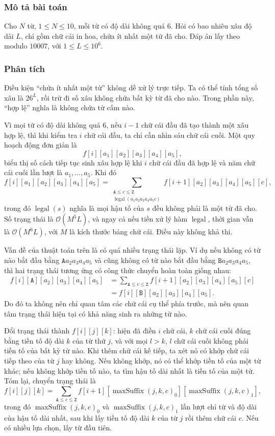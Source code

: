\documentclass[11pt]{article}
\newcommand{\Oh}{\mathcal{O}}
\newcommand{\legal}{\operatorname{legal}}
\newcommand{\maxSuffix}{\operatorname{maxSuffix}}
\begin{document}
\subsubsection{Mô tả bài toán}

Cho \(N\) từ, \(1\le N\le 10\), mỗi từ có độ dài không quá \(6\). Hỏi có bao
nhiêu xâu độ dài \(L\), chỉ gồm chữ cái in hoa, chứa ít nhất một từ đã cho.
Đáp án lấy theo modulo \(10007\), với \(1\le L\le 10^6\).

\subsubsection{Phân tích}

Điều kiện ``chứa ít nhất một từ'' không dễ xử lý trực tiếp. Ta có thể tính
tổng số xâu là \(26^L\), rồi trừ đi số xâu không chứa bất kỳ từ đã cho nào.
Trong phần này, ``hợp lệ'' nghĩa là không chứa từ cấm nào.

Vì mọi từ có độ dài không quá \(6\), nếu \(i-1\) chữ cái đầu đã tạo thành một
xâu hợp lệ, thì khi kiểm tra \(i\) chữ cái đầu, ta chỉ cần nhìn sáu chữ cái
cuối. Một quy hoạch động đơn giản là
\[
  f[i][a_1][a_2][a_3][a_4][a_5],
\]
biểu thị số cách tiếp tục sinh xâu hợp lệ khi \(i\) chữ cái đầu đã hợp lệ và
năm chữ cái cuối lần lượt là \(a_1,\ldots,a_5\). Khi đó
\[
  f[i][a_1][a_2][a_3][a_4][a_5]
  =
  \sum_{\substack{\texttt{A}\le c\le \texttt{Z}\\
      \legal(a_1a_2a_3a_4a_5c)}}
  f[i+1][a_2][a_3][a_4][a_5][c],
\]
trong đó \(\legal(s)\) nghĩa là mọi hậu tố của \(s\) đều không phải là một từ
đã cho. Số trạng thái là \(\Oh(M^5L)\), và ngay cả nếu tiền xử lý hàm
\(\legal\), thời gian vẫn là \(\Oh(M^6L)\), với \(M\) là kích thước bảng chữ
cái. Điều này không khả thi.

Vấn đề của thuật toán trên là có quá nhiều trạng thái lặp. Ví dụ nếu không có
từ nào bắt đầu bằng \(\texttt{A}a_2a_3a_4a_5\) và cũng không có từ nào bắt đầu
bằng \(\texttt{B}a_2a_3a_4a_5\), thì hai trạng thái tương ứng có công thức
chuyển hoàn toàn giống nhau:
\[
\begin{aligned}
  f[i][\texttt{A}][a_2][a_3][a_4][a_5]
  &=
  \sum_{\texttt{A}\le c\le\texttt{Z}}
  f[i+1][a_2][a_3][a_4][a_5][c]\\
  &=f[i][\texttt{B}][a_2][a_3][a_4][a_5].
\end{aligned}
\]
Do đó ta không nên chỉ quan tâm các chữ cái cụ thể phía trước, mà nên quan tâm
trạng thái hiện tại có khả năng sinh ra những từ nào.

Đổi trạng thái thành \(f[i][j][k]\): hiện đã điền \(i\) chữ cái, \(k\) chữ cái
cuối đúng bằng tiền tố độ dài \(k\) của từ thứ \(j\), và với mọi \(l>k\), \(l\)
chữ cái cuối không phải tiền tố của bất kỳ từ nào. Khi thêm chữ cái kế tiếp,
ta xét nó có khớp chữ cái tiếp theo của từ \(j\) hay không. Nếu không khớp, nó
có thể khớp tiền tố của một từ khác; nếu không khớp tiền tố nào, ta tìm hậu tố
dài nhất là tiền tố của một từ. Tóm lại, chuyển trạng thái là
\[
  f[i][j][k]
  =
  \sum_{\texttt{A}\le c\le\texttt{Z}}
  f[i+1][\maxSuffix(j,k,c)_0][\maxSuffix(j,k,c)_1],
\]
trong đó \(\maxSuffix(j,k,c)_0\) và \(\maxSuffix(j,k,c)_1\) lần lượt chỉ từ và
độ dài của hậu tố dài nhất, sau khi lấy tiền tố độ dài \(k\) của từ \(j\) rồi
thêm chữ cái \(c\). Nếu có nhiều lựa chọn, lấy từ đầu tiên.
\end{document}

